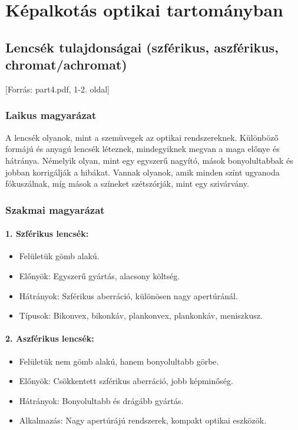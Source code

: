 \documentclass[a4paper,12pt]{article}
\begin{document}
\newpage

\section{Képalkotás optikai tartományban}

\subsection{Lencsék tulajdonságai (szférikus, aszférikus, chromat/achromat)} [Forrás: part4.pdf, 1-2. oldal]

\subsubsection{Laikus magyarázat} A lencsék olyanok, mint a szemüvegek az optikai rendszereknek. Különböző formájú és anyagú lencsék léteznek, mindegyiknek megvan a maga előnye és hátránya. Némelyik olyan, mint egy egyszerű nagyító, mások bonyolultabbak és jobban korrigálják a hibákat. Vannak olyanok, amik minden színt ugyanoda fókuszálnak, míg mások a színeket szétszórják, mint egy szivárvány.

\subsubsection{Szakmai magyarázat}

\paragraph{1. Szférikus lencsék:} \begin{itemize} \item Felületük gömb alakú. \item Előnyök: Egyszerű gyártás, alacsony költség. \item Hátrányok: Szférikus aberráció, különösen nagy apertúránál. \item Típusok: Bikonvex, bikonkáv, plankonvex, plankonkáv, meniszkusz. \end{itemize}

\paragraph{2. Aszférikus lencsék:} \begin{itemize} \item Felületük nem gömb alakú, hanem bonyolultabb görbe. \item Előnyök: Csökkentett szférikus aberráció, jobb képminőség. \item Hátrányok: Bonyolultabb és drágább gyártás. \item Alkalmazás: Nagy apertúrájú rendszerek, kompakt optikai eszközök. \end{itemize}
\end{document}
